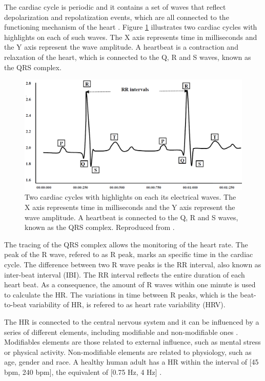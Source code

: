 The cardiac cycle is periodic and it contains a set of waves that reflect depolarization and repolatization events, which are all connected to the functioning mechanism of the heart \parencite{yanowitz2012introduction}. Figure \ref{fig:rr-interval} illustrates two cardiac cycles with highlights on each of such waves. The X axis represents time in milliseconds and the Y axis represent the wave amplitude. A heartbeat is a contraction and relaxation of the heart, which is connected to the Q, R and S waves, known as the QRS complex.

\begin{figure}[h!]
    \centering
    \includegraphics[width=1.0\linewidth]{figures/rr-interval.png}
    \caption{Two cardiac cycles with highlights on each its electrical waves. The X axis represents time in milliseconds and the Y axis represent the wave amplitude. A heartbeat is connected to the Q, R and S waves, known as the QRS complex. Reproduced from \textcite{ahmed2010heart}.}
    \label{fig:rr-interval}
\end{figure}

The tracing of the QRS complex allows the monitoring of the heart rate. The peak of the R wave, refered to as R peak, marks an specific time in the cardiac cycle. The difference between two R wave peaks is the RR interval, also known as inter-beat interval (IBI). The RR interval reflects the entire duration of each heart beat. As a consequence, the amount of R waves within one minute is used to calculate the HR. The variations in time between R peaks, which is the beat-to-beat variability of HR, is refered to as heart rate variability (HRV).

The HR is connected to the central nervous system and it can be influenced by a series of different elements, including modifiable and non-modifiable ones \parencite{valentini2009variables}. Modifiables elements are those related to external influence, such as mental stress or physical activity. Non-modifiable elements are related to physiology, such as age, gender and race. A healthy human adult has a HR within the interval of [45 bpm, 240 bpm], the equivalent of [0.75 Hz, 4 Hz] \parencite{li2014remote}.

